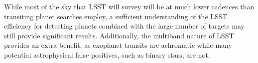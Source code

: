 While most of the sky that LSST will survey will be at much lower
cadences than transiting planet searches employ, a sufficient
understanding of the LSST efficiency for detecting planets combined with
the large number of targets may still provide significant results.
Additionally, the multiband nature of LSST provides an extra benefit, as
exoplanet transits are achromatic while many potential astrophysical
false positives, such as binary stars, are not.


%
%
%
%
%
%

\navigationbar
